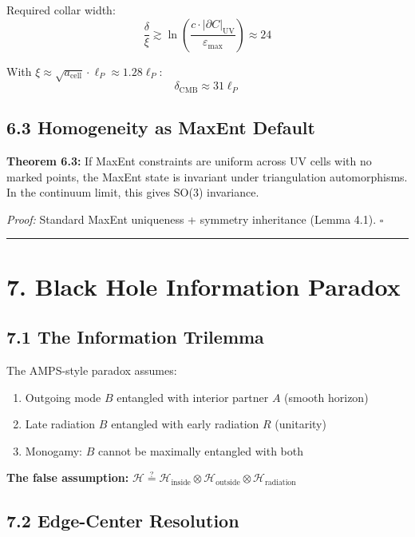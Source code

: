 Required collar width: \[\frac{\delta}{\xi} \gtrsim \ln\left(\frac{c \cdot |\partial C|_{\text{UV}}}{\varepsilon_{\text{max}}}\right) \approx 24\]

With \(\xi \approx \sqrt{a_{\text{cell}}} \cdot \ell_P \approx 1.28 \ell_P\): \[\delta_{\text{CMB}} \approx 31 \ell_P\]

\subsection{6.3 Homogeneity as MaxEnt Default}\label{63-homogeneity-as-maxent-default}

\textbf{Theorem 6.3:} If MaxEnt constraints are uniform across UV cells with no marked points, the MaxEnt state is invariant under triangulation automorphisms. In the continuum limit, this gives SO(3) invariance.

\emph{Proof:} Standard MaxEnt uniqueness + symmetry inheritance (Lemma 4.1). \(\square\)

\begin{center}\rule{0.5\linewidth}{0.5pt}\end{center}

\section{7. Black Hole Information Paradox}\label{7-black-hole-information-paradox}

\subsection{7.1 The Information Trilemma}\label{71-the-information-trilemma}

The AMPS-style paradox assumes:

\begin{enumerate}
\def\labelenumi{\arabic{enumi}.}
\tightlist
\item
  Outgoing mode \(B\) entangled with interior partner \(A\) (smooth horizon)
\item
  Late radiation \(B\) entangled with early radiation \(R\) (unitarity)
\item
  Monogamy: \(B\) cannot be maximally entangled with both
\end{enumerate}

\textbf{The false assumption:} \(\mathcal{H} \stackrel{?}{=} \mathcal{H}_{\text{inside}} \otimes \mathcal{H}_{\text{outside}} \otimes \mathcal{H}_{\text{radiation}}\)

\subsection{7.2 Edge-Center Resolution}\label{72-edge-center-resolution}


